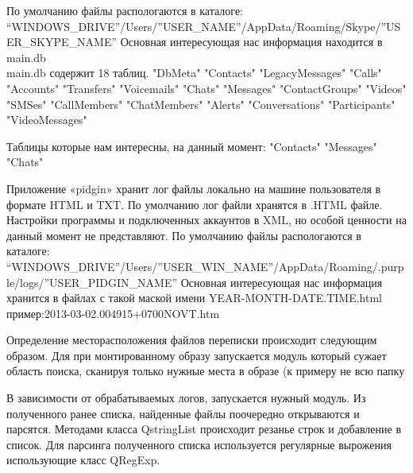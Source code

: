 По умолчанию файлы распологаются в каталоге: “WINDOWS_DRIVE”/Users/”USER_NAME”/AppData/Roaming/Skype/”USER_SKYPE_NAME”
Основная интересующая нас информация находится в main.db\\

main.db  содержит 18 таблиц. 
"DbMeta"   "Contacts"   "LegacyMessages"
"Calls"     "Accounts"   "Transfers"   
"Voicemails"   "Chats"      "Messages"   
"ContactGroups"   "Videos"   "SMSes"
"CallMembers"   "ChatMembers"   "Alerts"
"Conversations"     "Participants"   "VideoMessages"

Таблицы которые нам интересны, на данный момент:    
 "Contacts"    "Messages"    "Chats" 


Приложение «pidgin» хранит лог файлы локально на машине пользователя в формате HTML и TXT. По умолчанию лог файли хранятся в .HTML файле. Настройки программы и подключенных аккаунтов в XML, но особой ценности на данный момент не представляют.
По умолчанию файлы распологаются в каталоге: “WINDOWS_DRIVE”/Users/”USER_WIN_NAME”/AppData/Roaming/.purple/logs/”USER_PIDGIN_NAME”
Основная интересующая нас информация хранится в файлах с такой маской имени YEAR-MONTH-DATE.TIME.html пример:2013-03-02.004915+0700NOVT.htm\\


Определение месторасположения файлов переписки происходит следующим образом. Для при монтированному образу запускается модуль который сужает область поиска, сканируя только нужные места в образе (к примеру не всю папку %
\\


В зависимости от обрабатываемых логов, запускается нужный модуль. Из полученного ранее списка, найденные файлы поочередно открываются и парсятся. Методами класса QstringList происходит резанье строк и добавление в список. Для парсинга полученного списка используется регулярные вырожения использующие класс QRegExp.\\ 


